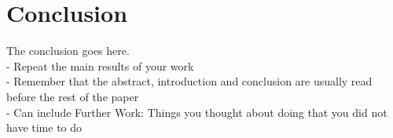 \section{Conclusion}
The conclusion goes here.
\\
- Repeat the main results of your work\\
- Remember that the abstract, introduction and 
conclusion are usually read before the rest of the 
paper\\
- Can include Further Work: Things you thought about doing that you did not have time to do\\